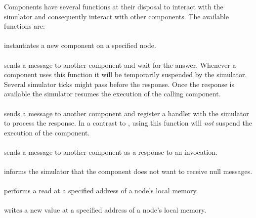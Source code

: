 Components have several functions at their disposal to interact with the simulator and consequently interact with other components.
The available functions are:

\paragraph{}
instantiates a new component on a specified node.
\paragraph{}
sends a message to another component and wait for the answer.
Whenever a component uses this function it will be temporarily suspended by the simulator.
Several simulator ticks might pass before the response.
Once the response is available the simulator resumes the execution of the calling component.
\paragraph{}
sends a message to another component and register a handler with the simulator to process the response.
In a contrast to , using this function will \emph{not} suspend the execution of the component.
\paragraph{}
sends a message to another component as a response to an invocation.
\paragraph{}
informs the simulator that the component does not want to receive null messages.
\paragraph{}
performs a read at a specified address of a node's local memory.
\paragraph{}
writes a new value at a specified address of a node's local memory.
